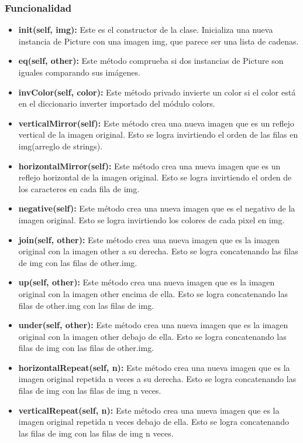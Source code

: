 \documentclass{article}
\begin{document}
\subsubsection{Funcionalidad}
\begin{itemize}
	\item {\textbf{init(self, img):}  Este es el constructor de la clase. Inicializa una nueva instancia de Picture con una imagen img, que parece ser una lista de cadenas.}
	\item {\textbf{eq(self, other):}  Este método comprueba si dos instancias de Picture son iguales comparando sus imágenes.}
	\item {\textbf{invColor(self, color):} Este método privado invierte un color si el color está en el diccionario inverter importado del módulo colors.}
	\item {\textbf{verticalMirror(self):} Este método crea una nueva imagen que es un reflejo vertical de la imagen original. Esto se logra invirtiendo el orden de las filas en img(arreglo de strings).}
	\item {\textbf{horizontalMirror(self):} Este método crea una nueva imagen que es un reflejo horizontal de la imagen original. Esto se logra invirtiendo el orden de los caracteres en cada fila de img.}
	\item {\textbf{negative(self):} Este método crea una nueva imagen que es el negativo de la imagen original. Esto se logra invirtiendo los colores de cada pixel en img.}
	\item {\textbf{join(self, other):} Este método crea una nueva imagen que es la imagen original con la imagen other a su derecha. Esto se logra concatenando las filas de img con las filas de other.img.}
	\item {\textbf{up(self, other):} Este método crea una nueva imagen que es la imagen original con la imagen other encima de ella. Esto se logra concatenando las filas de other.img con las filas de img.}
	\item {\textbf{under(self, other):} Este método crea una nueva imagen que es la imagen original con la imagen other debajo de ella. Esto se logra concatenando las filas de img con las filas de other.img.}
	\item {\textbf{horizontalRepeat(self, n):} Este método crea una nueva imagen que es la imagen original repetida n veces a su derecha. Esto se logra concatenando las filas de img con las filas de img n veces.}
	\item {\textbf{verticalRepeat(self, n):} Este método crea una nueva imagen que es la imagen original repetida n veces debajo de ella. Esto se logra concatenando las filas de img con las filas de img n veces.}
\end{itemize}
\end{document}
